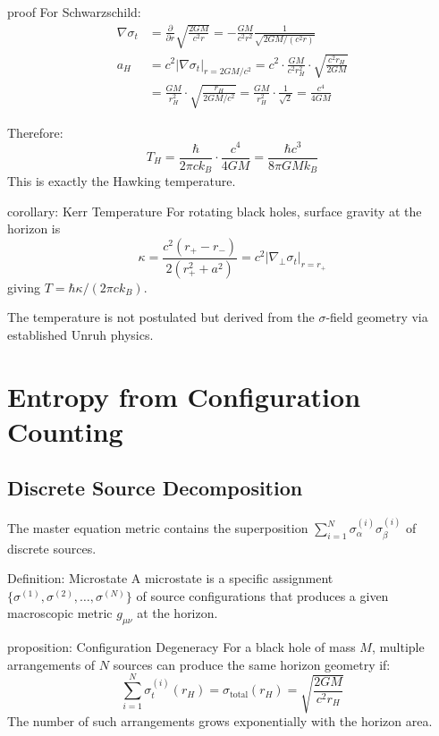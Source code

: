 \documentclass[11pt,a4paper]{article}
\theoremstyle{definition}
\theoremstyle{remark}
\begin{document}
	proof
		For Schwarzschild:
		\begin{align}
			\nabla \sigma_t &= \frac{\partial}{\partial r}\sqrt{\frac{2GM}{c^2r}} = -\frac{GM}{c^2 r^2} \frac{1}{\sqrt{2GM/(c^2r)}}\\
			a_H &= c^2 \left|\nabla \sigma_t\right|_{r=2GM/c^2} = c^2 \cdot \frac{GM}{c^2 r_H^2} \cdot \sqrt{\frac{c^2 r_H}{2GM}}\\
			&= \frac{GM}{r_H^2} \cdot \sqrt{\frac{r_H}{2GM/c^2}} = \frac{GM}{r_H^2} \cdot \frac{1}{\sqrt{2}} = \frac{c^4}{4GM}
		\end{align}
		
		Therefore:
		\begin{equation}
			T_H = \frac{\hbar}{2\pi c k_B} \cdot \frac{c^4}{4GM} = \frac{\hbar c^3}{8\pi GM k_B}
		\end{equation}
		This is exactly the Hawking temperature.
	
	corollary: Kerr Temperature
		For rotating black holes, surface gravity at the horizon is
		\begin{equation}
			\kappa = \frac{c^2(r_+ - r_-)}{2(r_+^2 + a^2)} = c^2|\nabla_\perp \sigma_t|_{r=r_+}
		\end{equation}
		giving $T = \hbar\kappa/(2\pi c k_B)$.
	
	The temperature is not postulated but derived from the $\sigma$-field geometry via established Unruh physics.
	
	\section{Entropy from Configuration Counting}
	
	\subsection{Discrete Source Decomposition}
	
	The master equation metric contains the superposition $\sum_{i=1}^N \sigma^{(i)}_\alpha \sigma^{(i)}_\beta$ of discrete sources. 
	
	Definition: Microstate
		A microstate is a specific assignment $\{\sigma^{(1)}, \sigma^{(2)}, \ldots, \sigma^{(N)}\}$ of source configurations that produces a given macroscopic metric $g_{\mu\nu}$ at the horizon.
	
	proposition: Configuration Degeneracy
		For a black hole of mass $M$, multiple arrangements of $N$ sources can produce the same horizon geometry if:
		\begin{equation}
			\sum_{i=1}^N \sigma^{(i)}_t(r_H) = \sigma_{\text{total}}(r_H) = \sqrt{\frac{2GM}{c^2 r_H}}
		\end{equation}
		The number of such arrangements grows exponentially with the horizon area.
	
\end{document}
